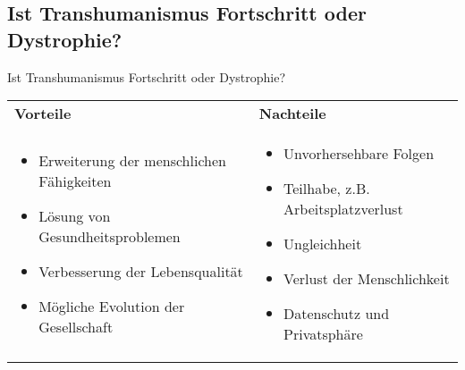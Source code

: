 \documentclass[aspectratio=169,16pt,xcolor=table]{beamer}
\begin{document}
\subsection{Ist Transhumanismus Fortschritt oder Dystrophie?}
 \begin{frame}{Ist Transhumanismus Fortschritt oder Dystrophie?}
    \begin{center}
    


\begin{tabular}{|p{6.5cm}|p{6.5cm}|}
    \hline
    \cellcolor{green!40}\textbf{Vorteile}  & \cellcolor{red!50}\textbf{Nachteile} \\
            \small
            \begin{itemize}
                \item Erweiterung der menschlichen Fähigkeiten
                \item Lösung von Gesundheitsproblemen
                \item Verbesserung der Lebensqualität
                \item Mögliche Evolution der Gesellschaft
            \end{itemize}
            & 
            \begin{itemize}
                \item Unvorhersehbare Folgen
                \item Teilhabe, z.B. Arbeitsplatzverlust
                \item Ungleichheit
                \item Verlust der Menschlichkeit
                \item Datenschutz und Privatsphäre
            \end{itemize} \\
        \hline
    \end{tabular}
    \end{center}
\end{frame}

\printbibliography %
\end{document}
